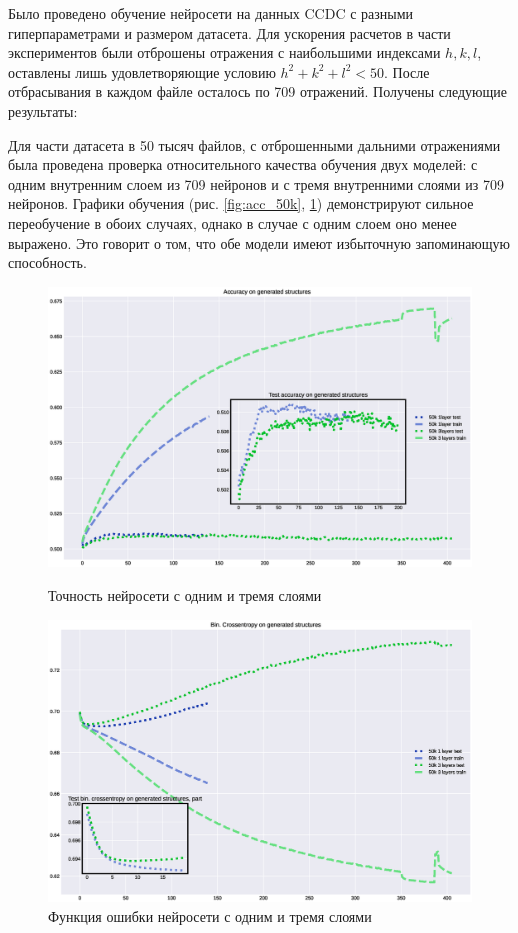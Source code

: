 \documentclass{article}
\begin{document}
Было проведено обучение нейросети на данных CCDC с разными гиперпараметрами и размером датасета. Для ускорения расчетов в части экспериментов были отброшены отражения с наибольшими индексами $h,k,l$, оставлены лишь удовлетворяющие условию $h^2+k^2+l^2<50$. После отбрасывания в каждом файле осталось по 709 отражений. Получены следующие результаты:

Для части датасета в 50 тысяч файлов, с отброшенными дальними отражениями была проведена проверка относительного качества обучения двух моделей: с одним внутренним слоем из 709 нейронов и с тремя внутренними слоями из 709 нейронов. Графики обучения (рис. \ref{fig:acc_50k}, \ref{fig:loss_50k}) демонстрируют сильное переобучение в обоих случаях, однако в случае с одним слоем оно менее выражено. Это говорит о том, что обе модели имеют избыточную запоминающую способность.

\begin{figure}[!h]
\includegraphics[width=\linewidth]{imgs/acc-50k.eps}
  \caption{Точность нейросети с одним и тремя слоями}\label{fig:acc_50k}
\endminipage\hfill
{}%
\includegraphics[width=\linewidth]{imgs/loss-50k.eps}
  \caption{Функция ошибки нейросети с одним и тремя слоями}\label{fig:loss_50k}
\endminipage
\end{figure}
\end{document}
